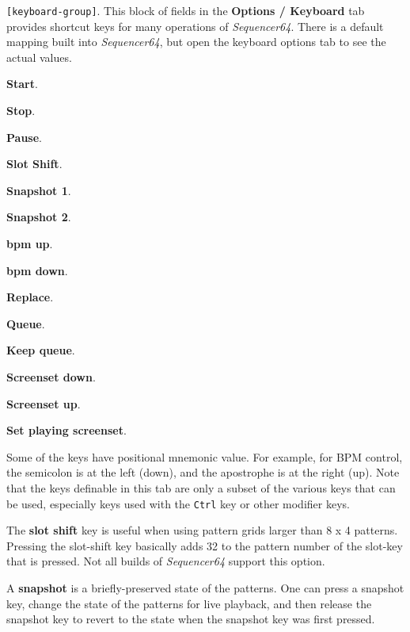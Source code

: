   \texttt{[keyboard-group]}.
   This block of fields in the \textbf{Options / Keyboard} tab
   provides shortcut keys for many operations of
   \textsl{Sequencer64}.  There is a default mapping built into
   \textsl{Sequencer64}, but open the keyboard options tab to see
   the actual values.
   

   \begin{enumber}
      \item \textbf{Start}.
      \item \textbf{Stop}.
      \item \textbf{Pause}.
      \item \textbf{Slot Shift}.
      \item \textbf{Snapshot 1}.
      \item \textbf{Snapshot 2}.
      \item \textbf{bpm up}.
      \item \textbf{bpm down}.
      \item \textbf{Replace}.
      \item \textbf{Queue}.
      \item \textbf{Keep queue}.
      \item \textbf{Screenset down}.
      \item \textbf{Screenset up}.
      \item \textbf{Set playing screenset}.
   \end{enumber}

   Some of the keys have positional mnemonic value.  For example,
   for BPM control, the semicolon is at the left (down), and the apostrophe
   is at the right (up).
   Note that the keys definable in this tab are only a subset of the
   various keys that can be used, especially keys used with the
   \texttt{Ctrl} key or other modifier keys.

   The \textbf{slot shift} key is useful when using pattern grids larger
   than 8 x 4 patterns.  Pressing the slot-shift key basically adds 32 to the
   pattern number of the slot-key that is pressed.
   Not all builds of \textsl{Sequencer64} support this option.

   A \textbf{snapshot} is a briefly-preserved state of the patterns.
   One can press a snapshot key, change the state of the patterns for live
   playback, and then release the snapshot key to revert to the state when
   the snapshot key was first pressed.

